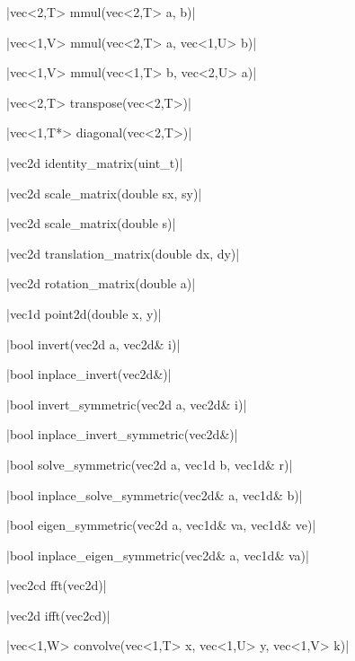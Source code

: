 \funcitem \cppinline|vec<2,T> mmul(vec<2,T> a, b)| 

\cppinline|vec<1,V> mmul(vec<2,T> a, vec<1,U> b)|

\cppinline|vec<1,V> mmul(vec<1,T> b, vec<2,U> a)|

\funcitem \cppinline|vec<2,T> transpose(vec<2,T>)| 

\funcitem \cppinline|vec<1,T*> diagonal(vec<2,T>)| 

\funcitem \cppinline|vec2d identity_matrix(uint_t)| 

\funcitem \cppinline|vec2d scale_matrix(double sx, sy)| 

\cppinline|vec2d scale_matrix(double s)|

\funcitem \cppinline|vec2d translation_matrix(double dx, dy)| 

\funcitem \cppinline|vec2d rotation_matrix(double a)| 

\funcitem \cppinline|vec1d point2d(double x, y)| 

\funcitem {} \cppinline|bool invert(vec2d a, vec2d& i)| 

 \cppinline|bool inplace_invert(vec2d&)| 

\funcitem {} \cppinline|bool invert_symmetric(vec2d a, vec2d& i)| 

 \cppinline|bool inplace_invert_symmetric(vec2d&)| 

\funcitem {} \cppinline|bool solve_symmetric(vec2d a, vec1d b, vec1d& r)| 

 \cppinline|bool inplace_solve_symmetric(vec2d& a, vec1d& b)| 

\funcitem {} \cppinline|bool eigen_symmetric(vec2d a, vec1d& va, vec1d& ve)| 

 \cppinline|bool inplace_eigen_symmetric(vec2d& a, vec1d& va)| 

\funcitem {} \cppinline|vec2cd fft(vec2d)| 

 \cppinline|vec2d ifft(vec2cd)| 

\funcitem \cppinline|vec<1,W> convolve(vec<1,T> x, vec<1,U> y, vec<1,V> k)| 
